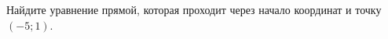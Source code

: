 \begin{ex}
	\begin{condition}
		Найдите уравнение прямой, которая проходит через начало координат и точку \( (-5;1) \).
	\end{condition}
\end{ex}